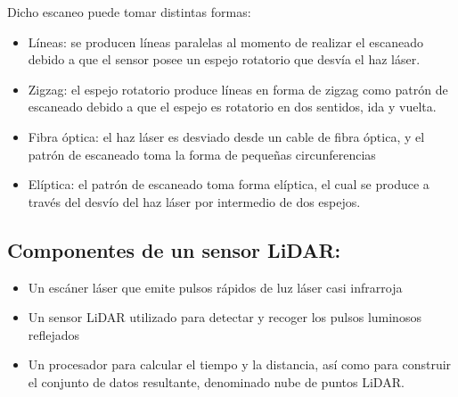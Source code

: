 Dicho escaneo puede tomar distintas formas:
\begin{itemize}
	\item Líneas: se producen líneas paralelas al momento de realizar el escaneado debido a que el sensor posee un espejo rotatorio que desvía el haz láser. 
	\item Zigzag: el espejo rotatorio produce líneas en forma de zigzag como patrón de escaneado debido a que el espejo es rotatorio en dos sentidos, ida y vuelta.  
	\item Fibra óptica: el haz láser es desviado desde un cable de fibra óptica, y el patrón de escaneado toma la forma de pequeñas circunferencias
	\item Elíptica: el patrón de escaneado toma forma elíptica, el cual se produce a través del desvío del haz láser por intermedio de dos espejos.
\end{itemize}

\subsection*{Componentes de un sensor LiDAR:}
\begin{itemize}
	\item Un escáner láser que emite pulsos rápidos de luz láser casi infrarroja
	\item Un sensor LiDAR utilizado para detectar y recoger los pulsos luminosos reflejados 
	\item Un procesador para calcular el tiempo y la distancia, así como para construir el conjunto de datos resultante, denominado nube de puntos LiDAR. 
\end{itemize}




